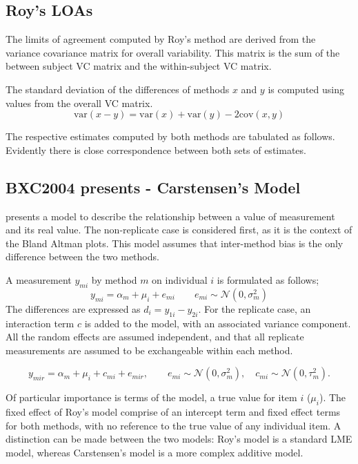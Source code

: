 \documentclass[12pt, a4paper]{report}
\theoremstyle{plain}
\theoremstyle{definition}
\theoremstyle{remark}
\begin{document}
	\subsection{Roy's LOAs}
	
	The limits of agreement computed by Roy's method are derived from the variance covariance matrix for overall variability.
	This matrix is the sum of the between subject VC matrix and the within-subject VC matrix.
	
	The standard deviation of the differences of methods $x$ and $y$ is computed using values from the overall VC matrix.
	\[
	\mbox{var}(x - y ) = \mbox{var} ( x )  + \mbox{var} ( y ) - 2\mbox{cov} ( x ,y )
	\]
	
	
	The respective estimates computed by both methods are tabulated as follows. Evidently there is close correspondence between both sets of estimates.
	
	

\subsection{BXC2004 presents - Carstensen's Model}

\citet{BXC2004} presents a model to describe the relationship between a value of measurement and its
real value. The non-replicate case is considered first, as it is the context of the Bland Altman plots. This model assumes that inter-method bias is the only difference between the two methods.

A measurement $y_{mi}$ by method $m$ on individual $i$ is formulated as follows;
\begin{equation}
y_{mi}  = \alpha_{m} + \mu_{i} + e_{mi} \qquad  e_{mi} \sim
\mathcal{N}(0,\sigma^{2}_{m})
\end{equation}
The differences are expressed as $d_{i} = y_{1i} - y_{2i}$. For the replicate case, an interaction term $c$ is added to the model, with an associated variance component. All the random effects are assumed independent, and that all replicate measurements are assumed to be exchangeable within each method.

\begin{equation}
y_{mir}  = \alpha_{m} + \mu_{i} + c_{mi} + e_{mir}, \qquad  e_{mi}
\sim \mathcal{N}(0,\sigma^{2}_{m}), \quad c_{mi} \sim \mathcal{N}(0,\tau^{2}_{m}).
\end{equation}

Of particular importance is terms of the model, a true value for item $i$ ($\mu_{i}$).  The fixed effect of Roy's model comprise of an intercept term and fixed effect terms for both methods, with no reference to the true value of any individual item. A distinction can be made between the two models: Roy's model is a standard LME model, whereas Carstensen's model is a more complex additive model.
\end{document}

